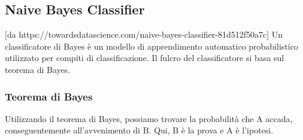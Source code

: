\subsection{Naive Bayes Classifier}
[da https://towardsdatascience.com/naive-bayes-classifier-81d512f50a7c]
Un classificatore di Bayes è un modello di apprendimento automatico probabilistico utilizzato per compiti di classificazione. Il fulcro del classificatore si basa sul teorema di Bayes.


\subsubsection{Teorema di Bayes}
Utilizzando il teorema di Bayes, possiamo trovare la probabilità che A accada, conseguentemente all’avvenimento di B. Qui, B è la prova e A è l'ipotesi. 

